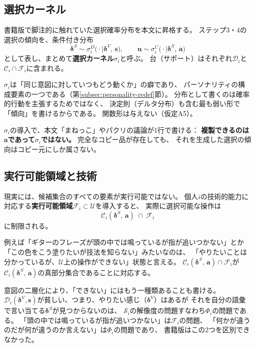 \documentclass[a4paper, fontsize=10pt]{jlreq}
\newcommand{\va}{\bm{a}}
\newcommand{\vs}{\bm{s}}
\newcommand{\vu}{\bm{u}}
\newcommand{\Si}{\mathcal{S}_i}
\newcommand{\Phii}{\Phi_i}
\newcommand{\Ci}{\mathcal{C}_i}
\newcommand{\Fi}{\mathcal{F}_i}
\newcommand{\U}{\mathcal{U}}
\newcommand{\dV}{\bm{\delta}^{V}}          %
\newcommand{\dS}{\bm{\delta}^{S}}          %
\newcommand{\Di}{\mathcal{D}_i}            %
\begin{document}
\subsection{選択カーネル}\label{subsec:kernel}

書籍版で脚注的に触れていた選択確率分布を本文に昇格する。
ステップ3・4の選択の傾向を、条件付き分布
\begin{equation}
  \dS \sim \sigma_i^{D}\bigl(\cdot \mid \dV,\, \vs\bigr),
  \qquad
  \vu \sim \sigma_i^{C}\bigl(\cdot \mid \dS,\, \va\bigr)
\end{equation}
として表し、まとめて\textbf{選択カーネル}$\sigma_i$と呼ぶ。
台（サポート）はそれぞれ$\Di$と$\Ci \cap \Fi$に含まれる。

$\sigma_i$は「同じ意図に対していつもどう動くか」の癖であり、
パーソナリティの構成要素の一つである（第\ref{subsec:personality-redef}節）。
分布として書くのは確率的行動を主張するためではなく、
決定則（デルタ分布）も含む最も弱い形で「傾向」を書けるからである。
関数形は与えない（仮定A5）。

$\sigma_i$の導入で、本文「まねっこ」やパクリの議論が1行で書ける：
\textbf{複製できるのは$\va$であって$\sigma_i$ではない。}
完全なコピー品が存在しても、
それを生成した選択の傾向はコピー元にしか属さない。

\subsection{実行可能領域と技術}\label{subsec:feasible}

現実には、候補集合のすべての要素が実行可能ではない。
個人$i$の技術的能力に対応する\textbf{実行可能領域}$\Fi \subset \U$を導入すると、
実際に選択可能な操作は
\begin{equation}
  \Ci(\dS,\, \va) \;\cap\; \Fi
\end{equation}
に制限される。

例えば「ギターのフレーズが頭の中では鳴っているが指が追いつかない」とか
「この色をこう塗りたいが技法を知らない」みたいなのは、
「やりたいことは分かっているが、$\U$上の操作ができない」状態と言える。
$\Ci(\dS,\, \va) \cap \Fi$が
$\Ci(\dS,\, \va)$の真部分集合であることに対応する。

意図の二層化により、「できない」にはもう一種類あることも書ける。
$\Di(\dV, \vs)$が貧しい、つまり、やりたい感じ（$\dV$）はあるが
それを自分の語彙で言い当てる$\dS$が見つからないのは、
$\Si$の解像度の問題すなわち$\Phii$の問題である。
「頭の中では鳴っているが指が追いつかない」は$\Fi$の問題、
「何かが違うのだが何が違うのか言えない」は$\Phii$の問題であり、
書籍版はこの2つを区別できなかった。
\end{document}
